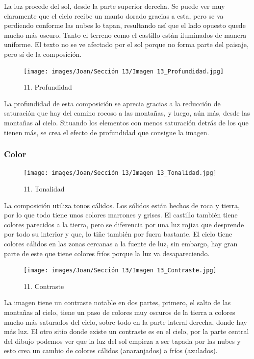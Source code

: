 \documentclass[12pt]{article}
\begin{document}
        La luz procede del sol, desde la parte superior derecha. Se puede ver muy claramente que el cielo recibe un manto dorado gracias a esta, pero se va perdiendo conforme las nubes lo tapan, resultando así que el lado opuesto quede mucho más oscuro. 
    Tanto el terreno como el castillo están iluminados de manera uniforme. El texto no se ve afectado por el sol porque no forma parte del paisaje, pero sí de la composición. 

    \begin{figure}[H]
          \centering
          \texttt{[image: images/Joan/Sección 13/Imagen 13\_Profundidad.jpg]}
          \caption{\small 11. Profundidad}
        \end{figure}

        La profundidad de esta composición se aprecia gracias a la reducción de saturación que hay del camino rocoso a las montañas, y luego, aún más, desde las montañas al cielo. 
    Situando los elementos con menos saturación detrás de los que tienen más, se crea el efecto de profundidad que consigue la imagen. 

            \subsubsection{Color}
    \begin{figure}[H]
          \centering
          \texttt{[image: images/Joan/Sección 13/Imagen 13\_Tonalidad.jpg]}
          \caption{\small 11. Tonalidad}
        \end{figure}

            La composición utiliza tonos cálidos. Los sólidos están hechos de roca y tierra, por lo que todo tiene unos colores marrones y grises. El castillo también tiene colores parecidos a la tierra, pero se diferencia por una luz rojiza que desprende por todo su interior y que, lo tiñe también por fuera bastante. 
    El cielo tiene colores cálidos en las zonas cercanas a la fuente de luz, sin embargo, hay gran parte de este que tiene colores fríos porque la luz va desapareciendo. 

            \begin{figure}[H]
          \centering
          \texttt{[image: images/Joan/Sección 13/Imagen 13\_Contraste.jpg]}
          \caption{\small 11. Contraste}
        \end{figure}
        La imagen tiene un contraste notable en dos partes, primero, el salto de las montañas al cielo, tiene un paso de colores muy oscuros de la tierra a colores mucho más saturados del cielo, sobre todo en la parte lateral derecha, donde hay más luz. 
    El otro sitio donde existe un contraste es en el cielo, por la parte central del dibujo podemos ver que la luz del sol empieza a ser tapada por las nubes y esto crea un cambio de colores cálidos (anaranjados) a fríos (azulados). 
\end{document}
